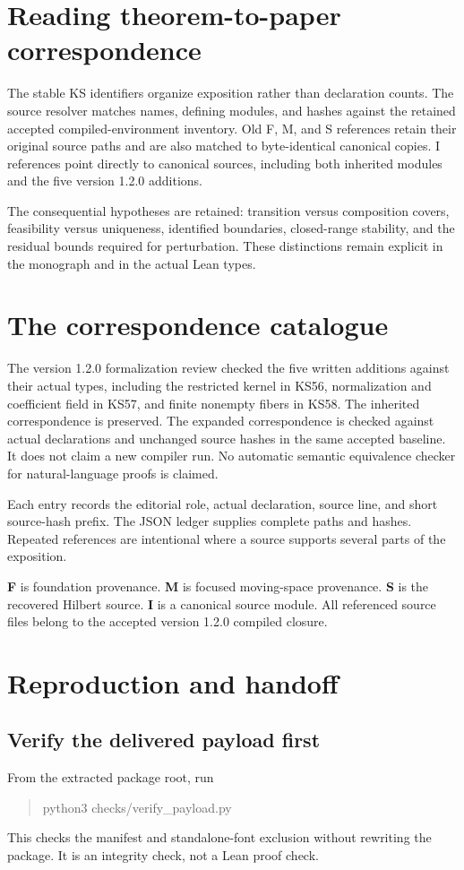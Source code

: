 \documentclass[11pt]{article}
\begin{document}
\section{Reading theorem-to-paper correspondence}
The stable KS identifiers organize exposition rather than declaration counts. The source resolver matches names, defining modules, and hashes against the retained accepted compiled-environment inventory. Old F, M, and S references retain their original source paths and are also matched to byte-identical canonical copies. I references point directly to canonical sources, including both inherited modules and the five version 1.2.0 additions.

The consequential hypotheses are retained: transition versus composition covers, feasibility versus uniqueness, identified boundaries, closed-range stability, and the residual bounds required for perturbation. These distinctions remain explicit in the monograph and in the actual Lean types.

\clearpage\section{The correspondence catalogue}
The version 1.2.0 formalization review checked the five written additions against their actual types, including the restricted kernel in KS56, normalization and coefficient field in KS57, and finite nonempty fibers in KS58. The inherited correspondence is preserved. The expanded correspondence is checked against actual declarations and unchanged source hashes in the same accepted baseline. It does not claim a new compiler run. No automatic semantic equivalence checker for natural-language proofs is claimed.

Each entry records the editorial role, actual declaration, source line, and short source-hash prefix. The JSON ledger supplies complete paths and hashes. Repeated references are intentional where a source supports several parts of the exposition.

\textbf{F} is foundation provenance. \textbf{M} is focused moving-space provenance. \textbf{S} is the recovered Hilbert source. \textbf{I} is a canonical source module. All referenced source files belong to the accepted version 1.2.0 compiled closure.


\clearpage\section{Reproduction and handoff}
\subsection{Verify the delivered payload first}
From the extracted package root, run
\begin{quote}\small\ttfamily
python3 checks/verify\_payload.py
\end{quote}
This checks the manifest and standalone-font exclusion without rewriting the package. It is an integrity check, not a Lean proof check.
\end{document}
